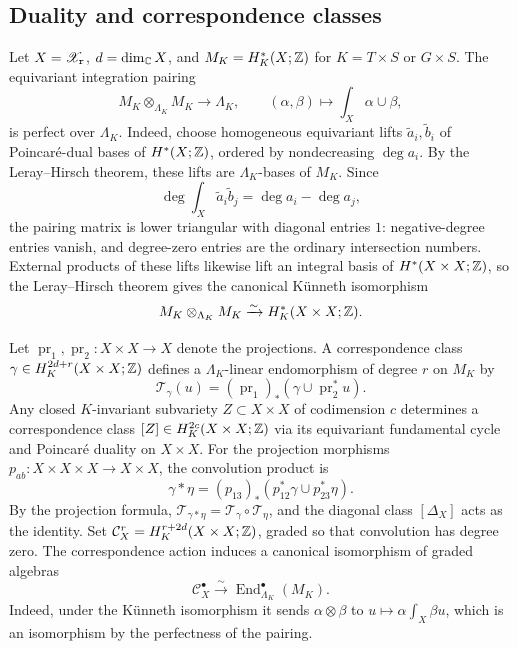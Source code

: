 \subsection{Duality and correspondence classes}\label{ss:duality}

Let $X=\mathscr X_{\mathtt r}$, $d=\dim_\mathbb C X$, and $M_K=H_K^*(X;\mathbb Z)$ for $K=T\times S$ or $G\times S$.
The equivariant integration pairing
\[
  M_K\otimes_{\Lambda_K}M_K\longrightarrow\Lambda_K,
  \qquad (\alpha,\beta)\longmapsto\int_X\alpha\cup\beta,
\]
is perfect over $\Lambda_K$.
Indeed, choose homogeneous equivariant lifts $\widetilde a_i,\widetilde b_i$
of Poincar\'e-dual bases of $H^*(X;\mathbb Z)$, ordered by nondecreasing $\deg a_i$.
By the Leray--Hirsch theorem, these lifts are $\Lambda_K$-bases of $M_K$. Since
\[
 \deg\int_X\widetilde a_i\widetilde b_j=\deg a_i-\deg a_j,
\]
the pairing matrix is lower triangular with diagonal entries $1$:
negative-degree entries vanish, and degree-zero entries are the ordinary intersection numbers.
External products of these lifts likewise lift an integral basis of $H^*(X\times X;\mathbb Z)$,
so the Leray--Hirsch theorem gives the canonical K\"unneth isomorphism
\[
  M_K\otimes_{\Lambda_K}M_K
  \xrightarrow{\sim}H_K^*(X\times X;\mathbb Z).
\]

Let $\operatorname{pr}_1,\operatorname{pr}_2:X\times X\to X$ denote the projections.
A correspondence class $\gamma\in H_K^{2d+r}(X\times X;\mathbb Z)$ defines a $\Lambda_K$-linear
endomorphism of degree $r$ on $M_K$ by
\begin{equation}\label{eq:correspondence_action}
 \mathcal T_\gamma(u)=(\operatorname{pr}_1)_*
       (\gamma\cup\operatorname{pr}_2^*u).
\end{equation}
Any closed $K$-invariant subvariety $Z\subset X\times X$ of codimension $c$ determines
a correspondence class $[Z]\in H_K^{2c}(X\times X;\mathbb Z)$ via its equivariant fundamental cycle
and Poincar\'e duality on $X\times X$.
For the projection morphisms $p_{ab}:X\times X\times X\to X\times X$, the
convolution product is
\begin{equation}\label{eq:convolution_product}
 \gamma*\eta=(p_{13})_*(p_{12}^*\gamma\cup p_{23}^*\eta).
\end{equation}
By the projection formula, $\mathcal T_{\gamma*\eta}=\mathcal T_\gamma\circ\mathcal T_\eta$,
and the diagonal class $[\Delta_X]$ acts as the identity.
Set $\mathcal C_X^r=H_K^{r+2d}(X\times X;\mathbb Z)$, graded so that convolution has degree zero.
The correspondence action induces a canonical isomorphism of graded algebras
\begin{equation}\label{eq:ambient_endomorphisms}
 \mathcal C_X^\bullet\xrightarrow{\sim}
 \operatorname{End}_{\Lambda_K}^\bullet(M_K).
\end{equation}
Indeed, under the K\"unneth isomorphism it sends $\alpha\otimes\beta$ to
$u\mapsto\alpha\int_X\beta u$, which is an isomorphism by the perfectness of the pairing.
